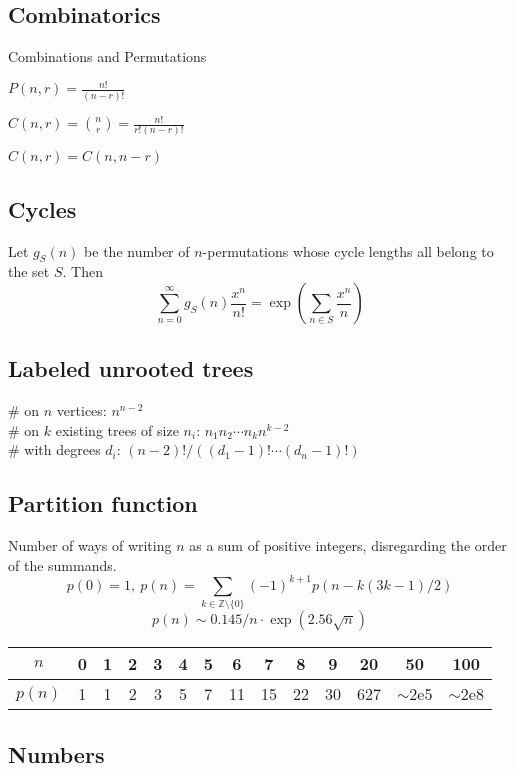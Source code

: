 \documentclass[
	a4paper,
	landscape,
	10pt,
]{article}
\begin{document}
\begin{multicols}{3}
    \subsection{Combinatorics}
        Combinations and Permutations
        
        $P(n,r) = \frac{n!}{(n-r)!}$
        
        $C(n,r) = \binom{n}{r} = \frac{n!}{r!(n-r)!}$
        
        $C(n,r) = C(n, n-r)$

	\subsection{Cycles}
		Let $g_S(n)$ be the number of $n$-permutations whose cycle lengths all belong to the set $S$. Then
		$$\sum_{n=0} ^\infty g_S(n) \frac{x^n}{n!} = \exp\left(\sum_{n\in S} \frac{x^n} {n} \right)$$
		
	\subsection{Labeled unrooted trees}
		\# on $n$ vertices: $n^{n-2}$ \\
		\# on $k$ existing trees of size $n_i$: $n_1n_2\cdots n_k n^{k-2}$ \\
		\# with degrees $d_i$: $(n-2)! / ((d_1-1)! \cdots (d_n-1)!)$

	\subsection{Partition function}
		Number of ways of writing $n$ as a sum of positive integers, disregarding the order of the summands.
		\[ p(0) = 1,\ p(n) = \sum_{k \in \mathbb Z \setminus \{0\}}{(-1)^{k+1} p(n - k(3k-1) / 2)} \]
		\[ p(n) \sim 0.145 / n \cdot \exp(2.56 \sqrt{n}) \]

		\begin{center}
		\begin{tabular}{c|c@{\ }c@{\ }c@{\ }c@{\ }c@{\ }c@{\ }c@{\ }c@{\ }c@{\ }c@{\ }c@{\ }c@{\ }c}
			$n$    & 0 & 1 & 2 & 3 & 4 & 5 & 6  & 7  & 8  & 9  & 20  & 50  & 100 \\ \hline
			$p(n)$ & 1 & 1 & 2 & 3 & 5 & 7 & 11 & 15 & 22 & 30 & 627 & $\mathtt{\sim}$2e5 & $\mathtt{\sim}$2e8 \\
		\end{tabular}
		\end{center}
	
	\subsection{Numbers}

\end{multicols}
\end{document}
